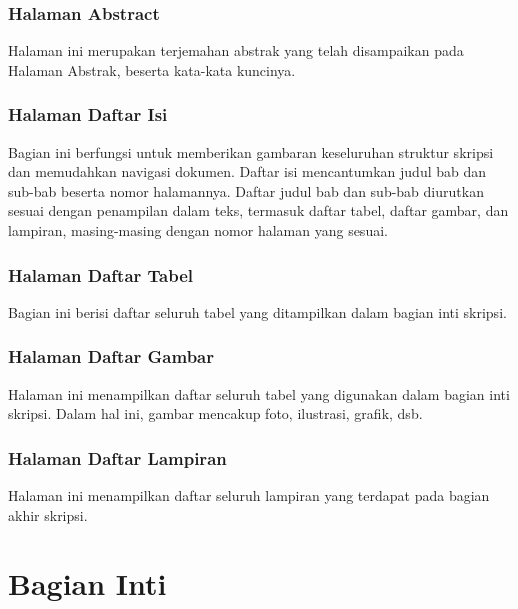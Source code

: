 \documentclass[
  indonesian,
  letterpaper,
]{scrbook}
\begin{document}
\subsubsection{Halaman Abstract}\label{halaman-abstract}

Halaman ini merupakan terjemahan abstrak yang telah disampaikan pada
Halaman Abstrak, beserta kata-kata kuncinya.

\subsubsection{Halaman Daftar Isi}\label{halaman-daftar-isi}

Bagian ini berfungsi untuk memberikan gambaran keseluruhan struktur
skripsi dan memudahkan navigasi dokumen. Daftar isi mencantumkan judul
bab dan sub-bab beserta nomor halamannya. Daftar judul bab dan sub-bab
diurutkan sesuai dengan penampilan dalam teks, termasuk daftar tabel,
daftar gambar, dan lampiran, masing-masing dengan nomor halaman yang
sesuai.

\subsubsection{Halaman Daftar Tabel}\label{halaman-daftar-tabel}

Bagian ini berisi daftar seluruh tabel yang ditampilkan dalam bagian
inti skripsi.

\subsubsection{Halaman Daftar Gambar}\label{halaman-daftar-gambar}

Halaman ini menampilkan daftar seluruh tabel yang digunakan dalam bagian
inti skripsi. Dalam hal ini, gambar mencakup foto, ilustrasi, grafik,
dsb.

\subsubsection{Halaman Daftar Lampiran}\label{halaman-daftar-lampiran}

Halaman ini menampilkan daftar seluruh lampiran yang terdapat pada
bagian akhir skripsi.

\section{Bagian Inti}\label{bagian-inti}
\end{document}
